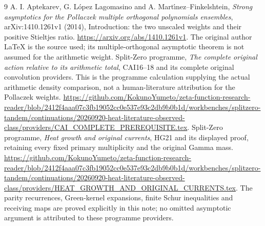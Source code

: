 \documentclass[11pt]{article}
\begin{document}
\begin{thebibliography}{9}
 A. I. Aptekarev, G. L\'opez Lagomasino and
A. Mart\'{\i}nez--Finkelshtein,
\emph{Strong asymptotics for the Pollaczek multiple orthogonal
polynomials ensembles}, arXiv:1410.1261v1 (2014), Introduction:
the two unscaled weights and their positive Stieltjes ratio.
\url{https://arxiv.org/abs/1410.1261v1}.
The original author LaTeX is the source used; its multiple-orthogonal
asymptotic theorem is not assumed for the arithmetic weight.
 Split-Zero programme, \emph{The complete original
action relative to its arithmetic total}, CAI16--18 and its complete original
convolution providers. This is the programme calculation supplying
the actual arithmetic density comparison, not a human-literature
attribution for the Pollaczek weights.
\url{https://github.com/KokunoYumeto/zeta-function-research-reader/blob/2412f4aaa07c3fb19052cc0e537e93c2db9b0b1d/workbenches/splitzero-tandem/continuations/20260920-heat-literature-observed-class/providers/CAI_COMPLETE_PREREQUISITE.tex}.
 Split-Zero programme, \emph{Heat growth and original
currents}, HG21 and its displayed proof, retaining every fixed
primary multiplicity and the original Gamma mass.
\url{https://github.com/KokunoYumeto/zeta-function-research-reader/blob/2412f4aaa07c3fb19052cc0e537e93c2db9b0b1d/workbenches/splitzero-tandem/continuations/20260920-heat-literature-observed-class/providers/HEAT_GROWTH_AND_ORIGINAL_CURRENTS.tex}.
The parity recurrences, Green-kernel expansions, finite Schur
inequalities and receiving maps are proved explicitly in this note;
no omitted asymptotic argument is attributed to these programme
providers.
\end{thebibliography}
\end{document}
